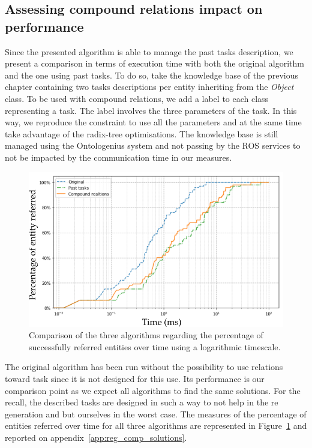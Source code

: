 \subsection{Assessing compound relations impact on performance}

Since the presented algorithm is able to manage the past tasks description, we present a comparison in terms of execution time with both the original algorithm and the one using past tasks. To do so, take the knowledge base of the previous chapter containing two tasks descriptions per entity inheriting from the \textit{Object} class. To be used with compound relations, we add a label to each class representing a task. The label involves the three parameters of the task. In this way, we reproduce the constraint to use all the parameters and at the same time take advantage of the radix-tree optimisations. The knowledge base is still managed using the Ontologenius system and not passing by the ROS services to not be impacted by the communication time in our measures.

\begin{figure}[ht!]
\centering
\includegraphics[scale=0.5]{figures/chapter7/comparison.png}
\caption{\label{fig:chap7_compare} Comparison of the three algorithms regarding the percentage of successfully referred entities over time using a logarithmic timescale. }
\end{figure}

The original algorithm has been run without the possibility to use relations toward task since it is not designed for this use. Its performance is our comparison point as we expect all algorithms to find the same solutions. For the recall, the described tasks are designed in such a way to not help in the \acrshort{re} generation and but ourselves in the worst case. The measures of the percentage of entities referred over time for all three algorithms are represented in Figure~\ref{fig:chap7_compare} and reported on appendix~\ref{app:reg_comp_solutions}.

